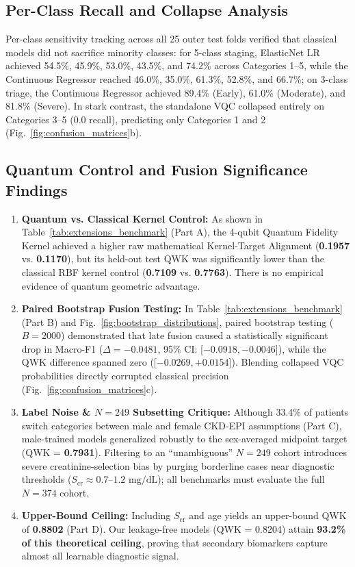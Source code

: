 \documentclass[10pt,conference]{IEEEtran}
\begin{document}
\subsection{Per-Class Recall and Collapse Analysis}
Per-class sensitivity tracking across all 25 outer test folds verified that classical models did not sacrifice minority classes: for 5-class staging, ElasticNet LR achieved 54.5\%, 45.9\%, 53.0\%, 43.5\%, and 74.2\% across Categories 1--5, while the Continuous Regressor reached 46.0\%, 35.0\%, 61.3\%, 52.8\%, and 66.7\%; on 3-class triage, the Continuous Regressor achieved 89.4\% (Early), 61.0\% (Moderate), and 81.8\% (Severe).
In stark contrast, the standalone VQC collapsed entirely on Categories 3--5 (0.0 recall), predicting only Categories 1 and 2 (Fig.~\ref{fig:confusion_matrices}b).

\subsection{Quantum Control and Fusion Significance Findings}
\begin{enumerate}
    \item \textbf{Quantum vs. Classical Kernel Control:} As shown in Table~\ref{tab:extensions_benchmark} (Part A), the 4-qubit Quantum Fidelity Kernel achieved a higher raw mathematical Kernel-Target Alignment (\textbf{0.1957} vs. \textbf{0.1170}), but its held-out test QWK was significantly lower than the classical RBF kernel control (\textbf{0.7109} vs. \textbf{0.7763}). There is no empirical evidence of quantum geometric advantage.
    \item \textbf{Paired Bootstrap Fusion Testing:} In Table~\ref{tab:extensions_benchmark} (Part B) and Fig.~\ref{fig:bootstrap_distributions}, paired bootstrap testing ($B = 2000$) demonstrated that late fusion caused a statistically significant drop in Macro-F1 ($\Delta = -0.0481$, 95\% CI: [$-0.0918, -0.0046$]), while the QWK difference spanned zero ([$-0.0269, +0.0154$]). Blending collapsed VQC probabilities directly corrupted classical precision (Fig.~\ref{fig:confusion_matrices}c).
    \item \textbf{Label Noise \& $N = 249$ Subsetting Critique:} Although 33.4\% of patients switch categories between male and female CKD-EPI assumptions (Part C), male-trained models generalized robustly to the sex-averaged midpoint target (QWK = \textbf{0.7931}). Filtering to an ``unambiguous'' $N = 249$ cohort introduces severe creatinine-selection bias by purging borderline cases near diagnostic thresholds ($S_{\text{cr}} \approx 0.7$--$1.2\text{ mg/dL}$); all benchmarks must evaluate the full $N = 374$ cohort.
    \item \textbf{Upper-Bound Ceiling:} Including $S_{\text{cr}}$ and age yields an upper-bound QWK of \textbf{0.8802} (Part D). Our leakage-free models (QWK = 0.8204) attain \textbf{93.2\% of this theoretical ceiling}, proving that secondary biomarkers capture almost all learnable diagnostic signal.
\end{enumerate}
\end{document}
